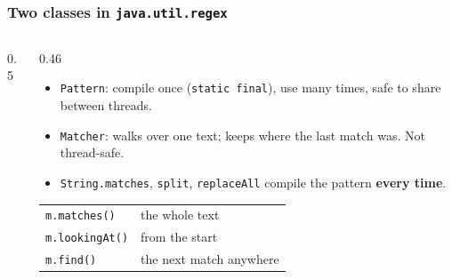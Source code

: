 \documentclass[aspectratio=169,10pt,compress]{beamer}
\begin{document}
\begin{frame}[t,fragile] \frametitle{Two classes in \texttt{java.util.regex}}
  \begin{columns}[T]
    \begin{column}{0.5\textwidth}
      \begin{center}
      \end{center}
    \end{column}
    \begin{column}{0.46\textwidth}
      \begin{itemize}\small
        \item \texttt{Pattern}: compile once (\texttt{static final}), use many times, safe to share between threads.
        \item \texttt{Matcher}: walks over one text; keeps where the last match was. Not thread-safe.
        \item \texttt{String.matches}, \texttt{split}, \texttt{replaceAll} compile the pattern \textbf{every time}.
      \end{itemize}
      \begin{center}\footnotesize
      \begin{tabular}{@{}ll@{}}
        \toprule
        \texttt{m.matches()}   & the whole text \\
        \texttt{m.lookingAt()} & from the start \\
        \texttt{m.find()}      & the next match anywhere \\
        \bottomrule
      \end{tabular}
      \end{center}
    \end{column}
  \end{columns}
\end{frame}
\end{document}
